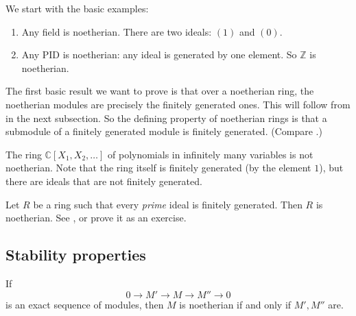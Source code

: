 We start with the basic examples:

\begin{example} 
\begin{enumerate}
\item Any field is noetherian. There are two ideals: $(1)$ and $(0)$. 
\item Any PID is noetherian: any ideal is generated by one element. So
$\mathbb{Z}$ is noetherian.
\end{enumerate}
\end{example} 

The first basic result we want to prove is that over a noetherian ring, the
noetherian modules are precisely the finitely generated ones.  This will
follow from  in the next subsection. So the defining 
property of noetherian rings is that a submodule of a finitely generated
module is finitely generated. (Compare
.)

\begin{exercise} 
The ring $\mathbb{C}[X_1, X_2, \dots]$ of polynomials in infinitely many
variables is not noetherian. Note that the ring itself is finitely generated
(by the element $1$), but there are ideals that are not finitely generated.
\end{exercise} 

\begin{remark} 
Let $R$ be a ring such that every \emph{prime} ideal is finitely generated.
Then $R$ is noetherian. See , or prove it as
an exercise. \end{remark}

\subsection{Stability properties}
\begin{proposition} \label{exactnoetherian}
If 
\[ 0 \to M' \to  M \to M'' \to 0  \]
is an exact sequence of modules, then $M$ is noetherian if and only if $M',
M''$ are.
\end{proposition} 

